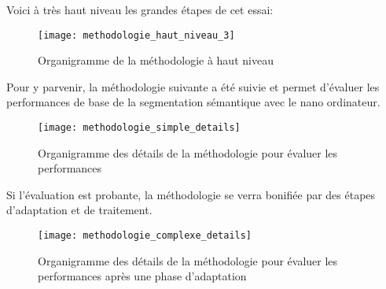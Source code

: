 ﻿\noindent Voici à très haut niveau les grandes étapes de cet essai:
\label{methodologie_haut_niveau}
\begin{figure}[H]
    \centering
    \texttt{[image: methodologie\_haut\_niveau\_3]}
    \caption{Organigramme de la méthodologie à haut niveau}
    \label{fig:methodologie_haut_niveau}
\end{figure}
\noindent Pour y parvenir, la méthodologie suivante a été suivie et permet d'évaluer les performances de base de la segmentation sémantique avec le nano ordinateur.
\label{methodologie_simple_details}
\begin{figure}[H]
    \centering
    \texttt{[image: methodologie\_simple\_details]}
    \caption{Organigramme des détails de la méthodologie pour évaluer les performances}
    \label{fig:methodologie_simple_details}
\end{figure}
\noindent Si l'évaluation est probante, la méthodologie se verra bonifiée par des étapes d'adaptation et de traitement. 
\label{methodologie_complexe_details}
\begin{figure}[H]
    \centering
    \texttt{[image: methodologie\_complexe\_details]}
    \caption{Organigramme des détails de la méthodologie pour évaluer les performances après une phase d'adaptation}
    \label{fig:methodologie_complexe_details}
\end{figure}
